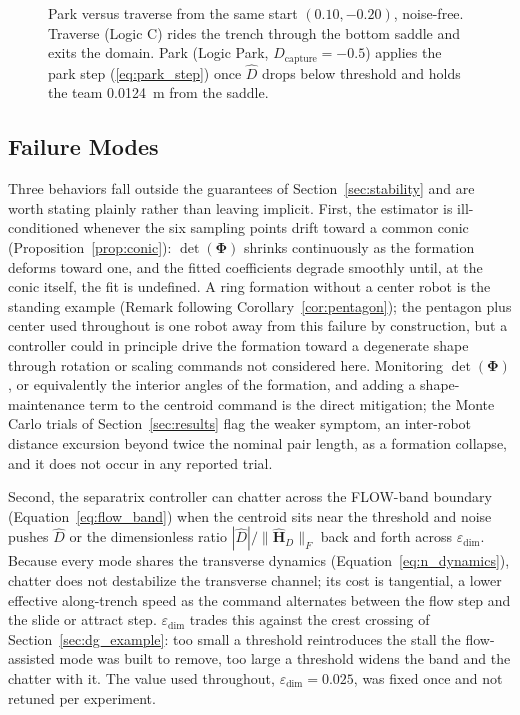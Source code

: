 \documentclass[12pt, letterpaper, oneside]{report}
\begin{document}
\begin{figure}[!t]
    \centering
    \framebox[0.9\linewidth]{\rule{0pt}{3.0cm}}
    \caption{Park versus traverse from the same start $(0.10, -0.20)$,
    noise-free. Traverse (Logic C) rides the trench through the bottom
    saddle and exits the domain. Park (Logic Park,
    $D_{\text{capture}} = -0.5$) applies the park step
    (\ref{eq:park_step}) once $\hat{D}$ drops below threshold and holds
    the team 0.0124~m from the saddle.}
    \label{fig:park_vs_traverse}
\end{figure}

\subsection{Failure Modes}

Three behaviors fall outside the guarantees of
Section~\ref{sec:stability} and are worth stating plainly rather than
leaving implicit. First, the estimator is ill-conditioned whenever the
six sampling points drift toward a common conic
(Proposition~\ref{prop:conic}): $\det(\boldsymbol{\Phi})$ shrinks
continuously as the formation deforms toward one, and the fitted
coefficients degrade smoothly until, at the conic itself, the fit is
undefined. A ring formation without a center robot is the standing
example (Remark following Corollary~\ref{cor:pentagon}); the pentagon
plus center used throughout is one robot away from this failure by
construction, but a controller could in principle drive the formation
toward a degenerate shape through rotation or scaling commands not
considered here. Monitoring $\det(\boldsymbol{\Phi})$, or equivalently
the interior angles of the formation, and adding a shape-maintenance
term to the centroid command is the direct mitigation; the Monte Carlo
trials of Section~\ref{sec:results} flag the weaker symptom, an
inter-robot distance excursion beyond twice the nominal pair length, as
a formation collapse, and it does not occur in any reported trial.

Second, the separatrix controller can chatter across the FLOW-band
boundary (Equation~\eqref{eq:flow_band}) when the centroid sits near the threshold
and noise pushes $\hat{D}$ or the dimensionless ratio
$|\hat{D}|/\|\hat{\mathbf{H}}_D\|_F$ back and forth across
$\varepsilon_{\text{dim}}$. Because every mode shares the transverse
dynamics (Equation~\eqref{eq:n_dynamics}), chatter does not destabilize the
transverse channel; its cost is tangential, a lower effective
along-trench speed as the command alternates between the flow step and
the slide or attract step. $\varepsilon_{\text{dim}}$ trades this
against the crest crossing of Section~\ref{sec:dg_example}: too small a
threshold reintroduces the stall the flow-assisted mode was built to
remove, too large a threshold widens the band and the chatter with it.
The value used throughout, $\varepsilon_{\text{dim}} = 0.025$, was fixed
once and not retuned per experiment.
\end{document}
